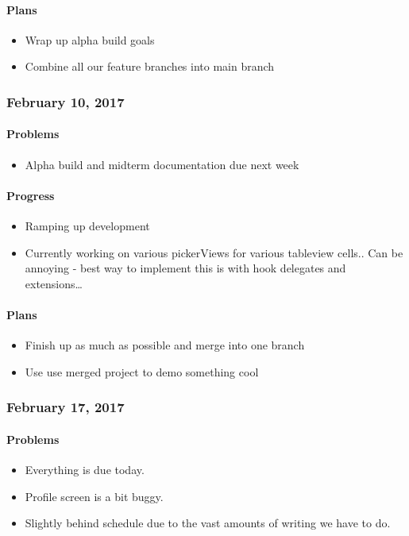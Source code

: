 \paragraph{Plans}\label{plans}
\begin{itemize}
\tightlist
\item
  Wrap up alpha build goals
\item
  Combine all our feature branches into main branch
\end{itemize}

\subsubsection{February 10, 2017}\label{section}
\paragraph{Problems}\label{problems}
\begin{itemize}
\tightlist
\item
  Alpha build and midterm documentation due next week
\end{itemize}
\paragraph{Progress}\label{progress}
\begin{itemize}
\tightlist
\item
  Ramping up development
\item
  Currently working on various pickerViews for various tableview cells..
  Can be annoying - best way to implement this is with hook delegates
  and extensions\ldots{}
\end{itemize}
\paragraph{Plans}\label{plans}
\begin{itemize}
\tightlist
\item
  Finish up as much as possible and merge into one branch
\item
  Use use merged project to demo something cool
\end{itemize}

\subsubsection{February 17, 2017}\label{section}
\paragraph{Problems}\label{problems}
\begin{itemize}
\tightlist
\item
  Everything is due today.
\item
  Profile screen is a bit buggy.
\item
  Slightly behind schedule due to the vast amounts of writing we have to
  do.
\end{itemize}
